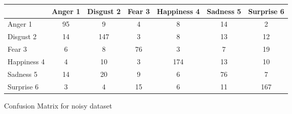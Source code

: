 \begin{figure}[h]
  \begin{center}
    \caption{Confusion Matrix for noisy dataset}
    \begin{tabular}{ | l || c | c | c | c | c | c | }
    \hline
          & Anger 1 & Disgust 2 & Fear 3 & Happiness 4 & Sadness 5 & Surprise 6 \\ \hline \hline
        Anger 1 & 95 & 9 & 4 & 8 & 14 & 2 \\ \hline
        Disgust 2 & 14 & 147 & 3 & 8 & 13 & 12 \\ \hline
        Fear 3 & 6 & 8 & 76 & 3 & 7 & 19 \\ \hline
        Happiness 4 & 4 & 10 & 3 & 174 & 13 & 10 \\ \hline
        Sadness 5 & 14 & 20 & 9 & 6 & 76 & 7 \\ \hline
        Surprise 6 & 3 & 4 & 15 & 6 & 11 & 167 \\ \hline
    \end{tabular}
    \label{fig:confusionMatrix}
\end{center}
\end{figure}
